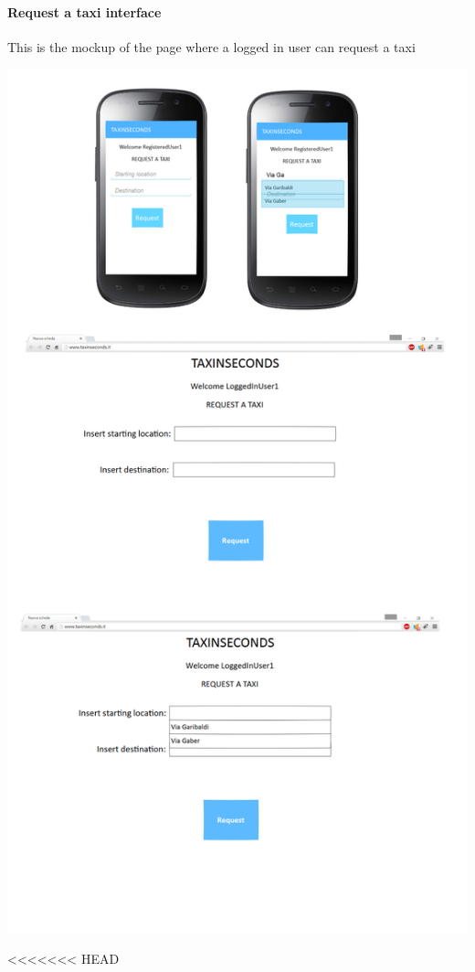 \documentclass{article}
\begin{document}
\paragraph{Request a taxi interface}
This is the mockup of the page where a logged in user can request a taxi\\
\begin{center}
	\includegraphics[width=.9\textwidth,height=.9\textheight,keepaspectratio]{RequestTaxiInterface}
\end{center}
\clearpage
<<<<<<< HEAD
\end{document}
